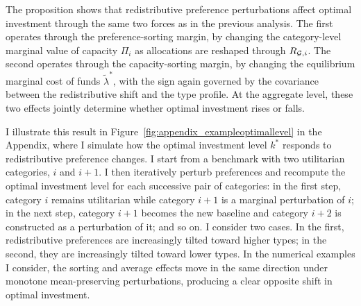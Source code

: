 \documentclass{class}
\begin{document}
The proposition shows that redistributive preference perturbations affect optimal investment through the same two forces as in the previous analysis. The first operates through the preference-sorting margin, by changing the category-level marginal value of capacity \(\Pi_i\) as allocations are reshaped through \(R_{\mathcal{G},i}\). The second operates through the capacity-sorting margin, by changing the equilibrium marginal cost of funds \(\tilde\lambda^\ast\), with the sign again governed by the covariance between the redistributive shift and the type profile. At the aggregate level, these two effects jointly determine whether optimal investment rises or falls.

I illustrate this result in Figure~\ref{fig:appendix_exampleoptimallevel} in the Appendix, where I simulate how the optimal investment level \(k^\ast\) responds to redistributive preference changes. I start from a benchmark with two utilitarian categories, \(i\) and \(i+1\). I then iteratively perturb preferences and recompute the optimal investment level for each successive pair of categories: in the first step, category \(i\) remains utilitarian while category \(i+1\) is a marginal perturbation of \(i\); in the next step, category \(i+1\) becomes the new baseline and category \(i+2\) is constructed as a perturbation of it; and so on. I consider two cases. In the first, redistributive preferences are increasingly tilted toward higher types; in the second, they are increasingly tilted toward lower types. In the numerical examples I consider, the sorting and average effects move in the same direction under monotone mean-preserving perturbations, producing a clear opposite shift in optimal investment.
\end{document}
